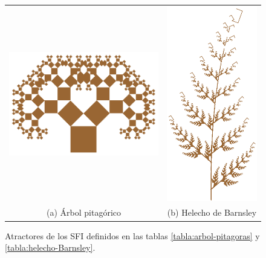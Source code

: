 \begin{figure}[ht]
    \centering
    \begin{tabular}{cc}
      \includegraphics[scale=0.5]{./img/C4/arbol-pitagoras.png} &   \includegraphics[scale=0.4]{./img/C4/helecho-barnsley.png} \\
    (a) Árbol pitagórico & (b) Helecho de Barnsley 
    \end{tabular}
    \caption{Atractores de los SFI definidos en las tablas \ref{tabla:arbol-pitagoras} y \ref{tabla:helecho-Barnsley}.}
    \label{fig:atractores-sfi}
\end{figure}

